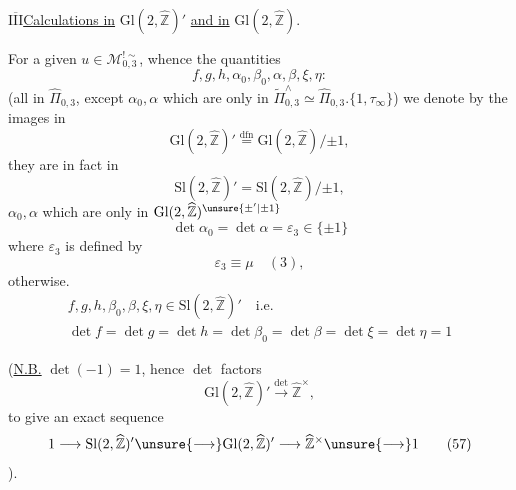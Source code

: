 
\uline{$\overline{\mathrm{III}}$}\quad \uline{Calculations in} $\mathrm{Gl}(2,\widehat{\mathbb Z})'$ \uline{and in} $\mathrm{Gl}(2,\widehat{\mathbb Z})$.

For a given $u\in\mathcal M_{0,3}^{!\sim}$, whence the quantities
\[
f,g,h,\alpha_0,\beta_0,\alpha,\beta,\xi,\eta:
\tag{53}
\]
(all in $\widehat{\Pi}_{0,3}$, except $\alpha_0,\alpha$ which are only in $\widetilde{\Pi}_{0,3}^{\wedge}\simeq\widehat{\Pi}_{0,3}.\{1,\tau_\infty\}$) we denote by the   images in 
\[
\mathrm{Gl}(2,\widehat{\mathbb Z})'\stackrel{\mathrm{dfn}}{=}\mathrm{Gl}(2,\widehat{\mathbb Z})/\mathord{\pm}1,
\]
they are in fact in
\[
\mathrm{Sl}(2,\widehat{\mathbb Z})'=\mathrm{Sl}(2,\widehat{\mathbb Z})/\mathord{\pm}1,
\]
 $\alpha_0,\alpha$ which are only in $\mathrm{Gl}(2,\widehat{\mathbb Z})^{\unsure{\pm'|\pm1}}$
\[
\det\alpha_0=\det\alpha=\varepsilon_3\in\{\pm1\}
\tag{54}
\]
where $\varepsilon_3$ is defined by
\[
\varepsilon_3\equiv\mu\quad(3),
\tag{55}
\]
 otherwise.
\[
\begin{gathered}
f,g,h,\beta_0,\beta,\xi,\eta\in\mathrm{Sl}(2,\widehat{\mathbb Z})'\quad\text{i.e.}\\
\det f=\det g=\det h=\det\beta_0=\det\beta=\det\xi=\det\eta=1
\end{gathered}
\tag{56}
\]

(\uline{N.B.}   $\det(-1)=1$, hence $\det$ factors
\[
\mathrm{Gl}(2,\widehat{\mathbb Z})'\xrightarrow{\det}\widehat{\mathbb Z}^{\times},
\]
to give an exact sequence
\[
1\longrightarrow\mathrm{Sl}(2,\widehat{\mathbb Z})'\unsure{\longrightarrow}\mathrm{Gl}(2,\widehat{\mathbb Z})'\longrightarrow\widehat{\mathbb Z}^{\times}\unsure{\longrightarrow}1
\tag{57}
\]
).

